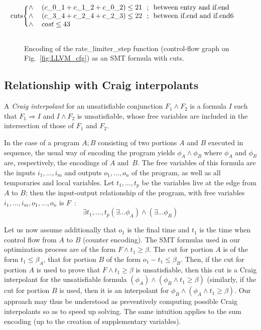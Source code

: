 \documentclass[a4paper,twocolumn,11pt]{article}
\begin{document}
\begin{figure*}
$$\begin{blockarray}{ll}
 \begin{block}{\Left{\rotatebox{90}{cuts}}{\{}ll}
	 \wedge & (c\_0\_1 + c\_1\_2 + c\_0\_2) \leq 21 \textnormal{~ ;~ between entry and if.end}\\
 \wedge & (c\_3\_4 + c\_2\_4 + c\_2\_3) \leq 22 \textnormal{~ ;~ between if.end and if.end6}\\
 \wedge & cost \leq 43\\
 \end{block}
\end{blockarray}
$$
\caption{Encoding of the rate\_limiter\_step function (control-flow graph on Fig.~\ref{fig:LLVM_cfg}) as an SMT formula with cuts.} 
\label{fig:LLVM_cfg_formula}
\end{figure*}

\subsection{Relationship with Craig interpolants}
\label{sec:interpolants}
A \emph{Craig interpolant} for an unsatisfiable conjunction $F_1 \land F_2$ is a formula $I$ such that $F_1 \Rightarrow I$ and $I \land F_2$ is unsatisfiable, whose free variables are included in the intersection of those of $F_1$ and $F_2$.

In the case of a program $A ; B$ consisting of two portions $A$ and $B$ executed in sequence, the usual way of encoding the program yields $\phi_A \land \phi_B$ where $\phi_A$ and $\phi_B$ are, respectively, the encodings of $A$ and~$B$.
The free variables of this formula are the inputs $i_1,\dots,i_m$ and outputs $o_1,\dots,o_n$ of the program, as well as all temporaries and local variables.
Let $t_1,\dots,t_p$ be the variables live at the edge from $A$ to $B$; then the input-output relationship of the program, with free variables $i_1,\dots,i_m,o_1,\dots,o_n$ is $F$~:
\begin{equation*}
\exists t_1,\dots,t_p (\exists \dots \phi_A) \land (\exists \dots \phi_B)
\end{equation*}

Let us now assume additionally that $o_1$ is the final time and $t_1$ is the time when control flow from $A$ to $B$ (counter encoding). The SMT formulas used in our optimization process are of the form $F \land t_1 \geq \beta$.
The cut for portion $A$ is of the form $t_1 \leq \beta_A$, that for portion $B$ of the form $o_1 - t_1 \leq \beta_B$. Then, if the cut for portion $A$ is used to prove that $F \land t_1 \geq \beta$ is unsatisfiable, then this cut is a Craig interpolant for the unsatisfiable formula $(\phi_A) \land (\phi_B \land t_1 \geq \beta)$ (similarly, if the cut for portion $B$ is used, then it is an interpolant for $\phi_B \land (\phi_A \land t_1 \geq \beta)$.
Our approach may thus be understood as preventively computing possible Craig interpolants so as to speed up solving.
The same intuition applies to the sum encoding (up to the creation of supplementary variables).
\end{document}
